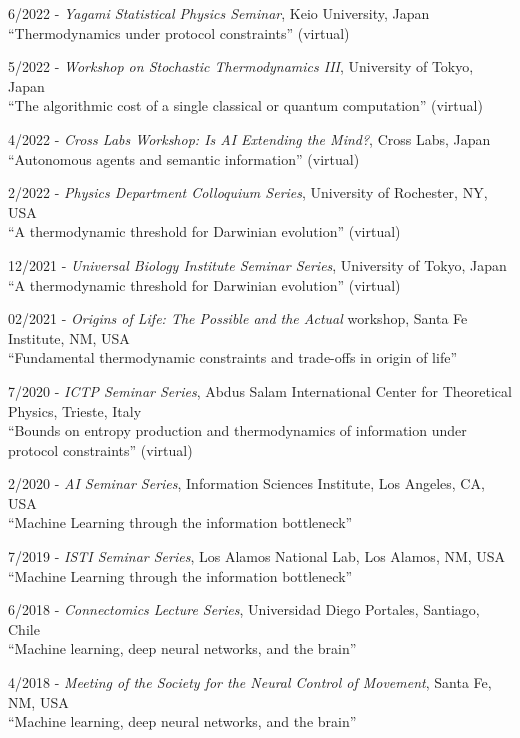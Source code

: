 \documentclass[margin,line,centered]{res}
\begin{document}
\begin{resume}
6/2022 - \emph{Yagami Statistical Physics Seminar}, Keio University, Japan\\
``Thermodynamics under protocol constraints'' (virtual)

5/2022 - \emph{Workshop on Stochastic Thermodynamics III}, University of Tokyo, Japan\\
``The algorithmic cost of a single classical or quantum computation'' (virtual) %

4/2022 - \emph{Cross Labs Workshop: Is AI Extending the Mind?}, Cross Labs, Japan\\
``Autonomous agents and semantic information'' (virtual) %

2/2022 - \emph{Physics Department Colloquium Series}, University of Rochester, NY, USA\\
``A thermodynamic threshold for Darwinian evolution'' (virtual) %

12/2021 - \emph{Universal Biology Institute Seminar Series}, University of Tokyo, Japan\\
``A thermodynamic threshold for Darwinian evolution'' (virtual) %

02/2021 - \emph{Origins of Life: The Possible and the Actual} workshop, Santa Fe Institute, NM, USA\\
``Fundamental thermodynamic constraints and trade-offs in origin of life'' %

7/2020 - \emph{ICTP Seminar Series}, Abdus Salam International Center for Theoretical Physics, Trieste, Italy\\
``Bounds on entropy production and thermodynamics of information under protocol constraints'' (virtual) %

2/2020 - \emph{AI Seminar Series}, Information Sciences Institute, Los Angeles, CA, USA\\
``Machine Learning through the information bottleneck'' %

7/2019 - \emph{ISTI Seminar Series}, Los Alamos National Lab, Los Alamos, NM, USA\\
``Machine Learning through the information bottleneck''  %

6/2018 - \emph{Connectomics Lecture Series}, Universidad Diego Portales, Santiago, Chile\\
``Machine learning, deep neural networks, and the brain''  %

4/2018 - \emph{Meeting of the Society for the Neural Control of Movement}, Santa Fe, NM, USA\\
``Machine learning, deep neural networks, and the brain''


\end{resume}
\end{document}
